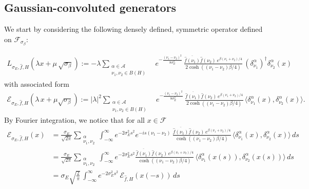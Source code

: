 \documentclass[11pt]{amsart}
\newcommand{\1}{\mathbbm{1}}
\theoremstyle{plain}
\theoremstyle{definition}
\theoremstyle{remark}
\numberwithin{equation}{section}
\begin{document}
\subsection{Gaussian-convoluted generators}\label{monotonicitygap}



We start by considering the following densely defined, symmetric operator defined on $\mathscr{F}_{\sigma_\beta}$:


\begin{align}
L_{\sigma_E,\widehat{f},H}(\lambda x+\mu\,\sqrt{\sigma_\beta}):=-\lambda \sum_{\substack{\alpha\in\mathcal{A}\\ \nu_1,\nu_2\in B(H)}}&e^{-\frac{(\nu_1-\nu_2)^2}{8\sigma_E^2}}\,\frac{\overline{\widehat{f}(\nu_1)}\widehat{f}(\nu_2)\,e^{\beta(\nu_1+\nu_2)/4}}{2\cosh((\nu_1-\nu_2)\beta/4)}\, (\delta^{\alpha}_{\nu_1})^\dagger\delta^\alpha_{\nu_2}(x)
\end{align}
with associated form
\begin{align}\label{calEGibbs1}
\mathcal{E}_{\sigma_E,\widehat{f},H}(\lambda\,x+\mu\sqrt{\sigma_\beta}):=|\lambda|^2\sum_{\substack{\alpha\in\mathcal{A}\\ \nu_1,\nu_2\in B(H)}}&e^{-\frac{(\nu_1-\nu_2)^2}{8\sigma_E^2}}\,\frac{\overline{\widehat{f}(\nu_1)}\widehat{f}(\nu_2)\,e^{\beta(\nu_1+\nu_2)/4}}{2\cosh((\nu_1-\nu_2)\beta/4)}\, \langle \delta^\alpha_{\nu_1}(x),\delta^\alpha_{\nu_2}(x)\rangle.
\end{align}
By Fourier integration, we notice that for all $x\in\mathscr{F}$
\begin{align}
\mathcal{E}_{\sigma_E,\widehat{f},H}(x) &=\frac{\sigma_E}{\sqrt{2\pi}}\sum_{\substack{\alpha\\\nu_1,\nu_2}}\int_{-\infty}^\infty \!\!\!e^{-2\sigma_E^2s^2}  e^{-is (\nu_1-\nu_2)} \, \frac{\overline{\widehat{f}(\nu_1)}\widehat{f}(\nu_2)\,e^{\beta(\nu_1+\nu_2)/4}}{\cosh((\nu_1-\nu_2)\beta/4)}\,\langle \delta^\alpha_{\nu_1}(x),\delta^\alpha_{\nu_2}(x)\rangle\,ds\nonumber \\
&=\frac{\sigma_E}{\sqrt{2\pi}}\sum_{\substack{\alpha\\\nu_1,\nu_2}}\int_{-\infty}^\infty \!\!\!e^{-2\sigma_E^2s^2}  \frac{\overline{\widehat{f}(\nu_1)}\widehat{f}(\nu_2)\,e^{\beta(\nu_1+\nu_2)/4}}{\cosh((\nu_1-\nu_2)\beta/4)}\,\langle \delta^\alpha_{\nu_1}(x(s)),\delta^\alpha_{\nu_2}(x(s))\rangle\,ds\nonumber \\
&=\sigma_E{\sqrt{\frac{2}{\pi}}}\,\int_{-\infty}^\infty e^{-2\sigma_E^2s^2}\,\mathcal{E}_{\widehat{f},H}(x(-s))\,ds\label{integralrepLse}
\end{align}
\end{document}
